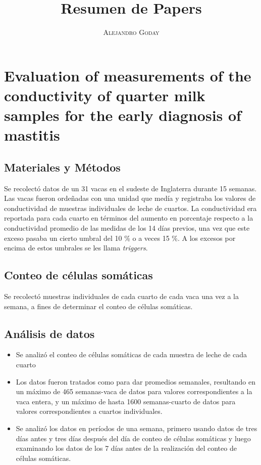 \documentclass[a4paper, 11pt]{article}
\title{\huge Resumen de Papers\\}
\author{\textsc{Alejandro Goday}}
\begin{document}
	
	\maketitle

\section{Evaluation of measurements of the conductivity of quarter milk samples for	the early diagnosis of mastitis}
\subsection{Materiales y Métodos}
Se recolectó datos de un 31 vacas en el sudeste de Inglaterra durante 15 semanas. Las vacas fueron ordeñadas con una unidad que medía y registraba los valores de conductividad de muestras individuales de leche de cuartos. La conductividad era reportada para cada cuarto en términos del aumento en porcentaje respecto a la conductividad promedio de las medidas de los 14 días previos, una vez que este exceso pasaba un cierto umbral del 10 \% o a veces 15 \%. A los excesos por encima de estos umbrales se les llama \emph{triggers}.  

\subsection{Conteo de células somáticas}
Se recolectó muestras individuales de cada cuarto de cada vaca una vez a la semana, a fines de determinar el conteo de células somáticas.

\subsection{Análisis de datos}
\begin{itemize}
	\item Se analizó el conteo de células somáticas de cada muestra de leche de cada cuarto
	\item Los datos fueron tratados como para dar promedios semanales, resultando en un máximo de 465 semanas-vaca de datos para valores correspondientes a la vaca entera, y un máximo de hasta 1600 semanas-cuarto de datos para valores correspondientes a cuartos individuales.
	\item Se analizó los datos en períodos de una semana, primero usando datos de tres días antes y tres días después del día de conteo de células somáticas y luego examinando los datos de los 7 días antes de la realización del conteo de células somáticas.
\end{itemize}
\end{document}
